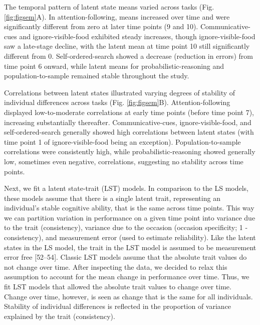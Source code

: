 \documentclass[
  man,floatsintext]{apa6}
\begin{document}
The temporal pattern of latent state means varied across tasks (Fig. \ref{fig:figsem}A). In attention-following, means increased over time and were significantly different from zero at later time points (9 and 10). Communicative-cues and ignore-visible-food exhibited steady increases, though ignore-visible-food saw a late-stage decline, with the latent mean at time point 10 still significantly different from 0. Self-ordered-search showed a decrease (reduction in errors) from time point 6 onward, while latent means for probabilistic-reasoning and population-to-sample remained stable throughout the study.

Correlations between latent states illustrated varying degrees of stability of individual differences across tasks (Fig. \ref{fig:figsem}B). Attention-following displayed low-to-moderate correlations at early time points (before time point 7), increasing substantially thereafter. Communicative-cues, ignore-visible-food, and self-ordered-search generally showed high correlations between latent states (with time point 1 of ignore-visible-food being an exception). Population-to-sample correlations were consistently high, while probabilistic-reasoning showed generally low, sometimes even negative, correlations, suggesting no stability across time points.

Next, we fit a latent state-trait (LST) models. In comparison to the LS models, these models assume that there is a single latent trait, representing an individual's stable cognitive ability, that is the same across time points. This way we can partition variation in performance on a given time point into variance due to the trait (consistency), variance due to the occasion (occasion specificity; 1 - consistency), and measurement error (used to estimate reliability). Like the latent states in the LS model, the trait in the LST model is assumed to be measurement error free {[}52--54{]}. Classic LST models assume that the absolute trait values do not change over time. After inspecting the data, we decided to relax this assumption to account for the mean change in performance over time. Thus, we fit LST models that allowed the absolute trait values to change over time. Change over time, however, is seen as change that is the same for all individuals. Stability of individual differences is reflected in the proportion of variance explained by the trait (consistency).
\end{document}
